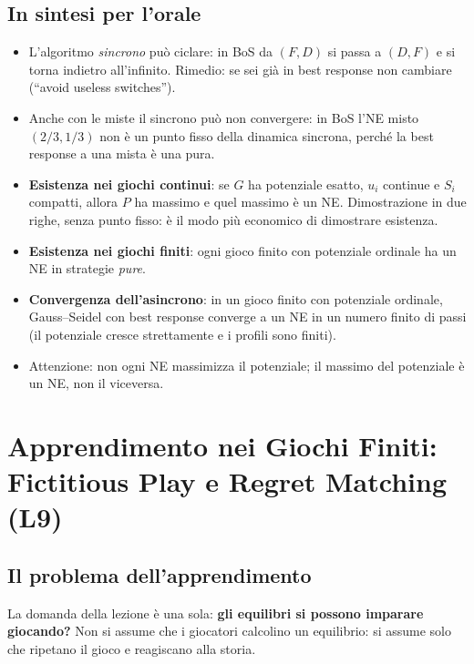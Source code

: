 \documentclass[12pt,a4paper,twoside]{book}
\theoremstyle{plain}
\theoremstyle{definition}
\begin{document}
\section*{In sintesi per l'orale}
\begin{itemize}
  \item L'algoritmo \emph{sincrono} può ciclare: in BoS da $(F,D)$ si passa a $(D,F)$ e si torna indietro all'infinito. Rimedio: se sei già in best response non cambiare (``avoid useless switches'').
  \item Anche con le miste il sincrono può non convergere: in BoS l'NE misto $(2/3,1/3)$ non è un punto fisso della dinamica sincrona, perché la best response a una mista è una pura.
  \item \textbf{Esistenza nei giochi continui}: se $G$ ha potenziale esatto, $u_i$ continue e $S_i$ compatti, allora $P$ ha massimo e quel massimo è un NE. Dimostrazione in due righe, senza punto fisso: è il modo più economico di dimostrare esistenza.
  \item \textbf{Esistenza nei giochi finiti}: ogni gioco finito con potenziale ordinale ha un NE in strategie \emph{pure}.
  \item \textbf{Convergenza dell'asincrono}: in un gioco finito con potenziale ordinale, Gauss--Seidel con best response converge a un NE in un numero finito di passi (il potenziale cresce strettamente e i profili sono finiti).
  \item Attenzione: non ogni NE massimizza il potenziale; il massimo del potenziale è un NE, non il viceversa.
\end{itemize}

\chapter{Apprendimento nei Giochi Finiti: Fictitious Play e Regret Matching (L9)}

\section{Il problema dell'apprendimento}

La domanda della lezione è una sola: \textbf{gli equilibri si possono imparare
giocando?} Non si assume che i giocatori calcolino un equilibrio: si assume solo
che ripetano il gioco e reagiscano alla storia.
\end{document}
